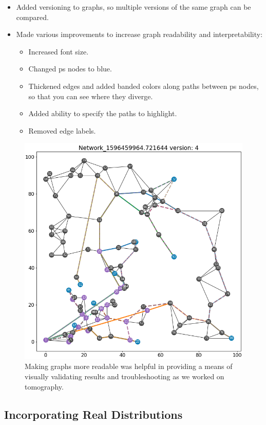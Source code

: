 \documentclass{finalreport}
\begin{document}
\begin{itemize}
	\item Added versioning to graphs, so multiple versions of the same graph can be compared.
	\item Made various improvements to increase graph readability and interpretability:
	\begin{itemize}
		\item Increased font size.
		\item Changed \gls{ps} nodes to blue.
		\item Thickened edges and added banded colors along paths between \gls{ps} nodes, so that you can see where they diverge.
		\item Added ability to specify the paths to highlight.
		\item Removed edge labels.
	\end{itemize}
\end{itemize}

\begin{figure}[!ht]
\centering
\includegraphics[width=.8\linewidth]{final/color.png}
\caption{Making graphs more readable was helpful in providing a means of visually validating results and troubleshooting as we worked on \gls{tomography}.}
\end{figure}


\subsection*{Incorporating Real Distributions}
\end{document}
